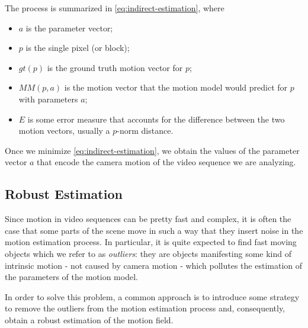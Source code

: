 The process is summarized in \cref{eq:indirect-estimation}, where
\begin{itemize}
    \item $a$ is the parameter vector;
    \item $p$ is the single pixel (or block);
    \item $gt(p)$ is the ground truth motion vector for $p$;
    \item $MM(p,a)$ is the motion vector that the motion model would predict for $p$ with parameters $a$;
    \item $E$ is some error measure that accounts for the difference between the two motion vectors, usually a \(p\)-norm distance.
\end{itemize}



Once we minimize \cref{eq:indirect-estimation}, we obtain the values of the parameter vector $a$ that encode the camera motion of the video sequence we are analyzing.

\subsection{Robust Estimation}
Since motion in video sequences can be pretty fast and complex, it is often the case that some parts of the scene move in such a way that they insert noise in the motion estimation process.
In particular, it is quite expected to find fast moving objects which we refer to as \emph{outliers}: they are objects manifesting some kind of intrinsic motion - not caused by camera motion - which pollutes the estimation of the parameters of the motion model.

In order to solve this problem, a common approach is to introduce some strategy to remove the outliers from the motion estimation process and, consequently, obtain a robust estimation of the motion field.
